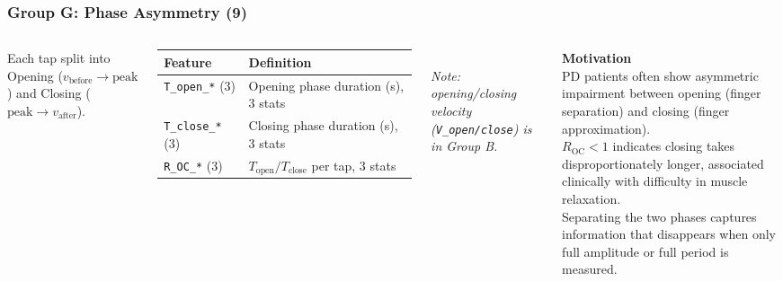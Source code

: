 \documentclass[aspectratio=169]{beamer}
\begin{document}
\begin{frame}
    \frametitle{Group G: Phase Asymmetry (9)}
    \scriptsize
    \begin{columns}[T]
        Each tap split into Opening ($v_\text{before}{\to}\text{peak}$) and Closing ($\text{peak}{\to}v_\text{after}$).\\[0.3em]
        \renewcommand{\arraystretch}{1.2}
        \begin{tabular}{p{2.8cm}p{4.2cm}}
            \toprule
            \textbf{Feature} & \textbf{Definition} \\
            \midrule
            \texttt{T\_open\_*} (3) & Opening phase duration (s), 3 stats \\
            \texttt{T\_close\_*} (3) & Closing phase duration (s), 3 stats \\
            \texttt{R\_OC\_*} (3) & $T_\text{open}/T_\text{close}$ per tap, 3 stats \\
            \bottomrule
        \end{tabular}\\[0.3em]
        \emph{Note: opening/closing velocity (\texttt{V\_open/close}) is in Group B.}

        \textbf{Motivation}\\[0.3em]
        PD patients often show asymmetric impairment between opening (finger separation) and closing (finger approximation).\\[0.4em]
        $R_\text{OC} < 1$ indicates closing takes disproportionately longer, associated clinically with difficulty in muscle relaxation.\\[0.4em]
        Separating the two phases captures information that disappears when only full amplitude or full period is measured.
    \end{columns}
\end{frame}
\end{document}
